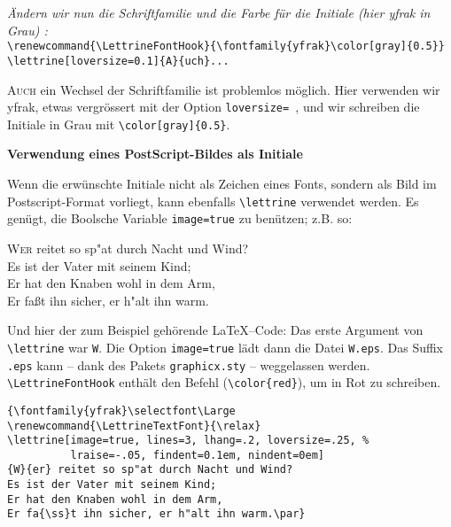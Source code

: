 \documentclass[12pt,a4paper]{article}
\begin{document}
\vspace{.5\baselineskip}
\textit{\"Andern wir nun die Schriftfamilie und die Farbe f\"ur die Initiale
(hier yfrak in Grau) :}\\
\verb+\renewcommand{\LettrineFontHook}{\fontfamily{yfrak}\color[gray]{0.5}}+\\
\verb+\lettrine[loversize=0.1]{A}{uch}...+

{%
\renewcommand{\LettrineFontHook}{\fontfamily{yfrak}\color[gray]{0.5}}

\lettrine[loversize=0.1]{A}{uch} ein Wechsel der
Schriftfamilie ist problemlos m\"oglich. Hier verwenden wir yfrak,
etwas vergr\"ossert mit der Option \verb+loversize= +, und wir schreiben
die Initiale in Grau mit \verb+\color[gray]{0.5}+.
\par}

\newpage
\begin{center}
\large\bfseries Verwendung eines PostScript-Bildes als Initiale
\end{center}

\vspace{\baselineskip} Wenn die erw\"unschte Initiale nicht als Zeichen eines
Fonts, sondern als Bild im Postscript-Format vorliegt, kann ebenfalls
\verb+\lettrine+ verwendet werden. Es gen\"ugt,
die Boolsche Variable \texttt{image=true} zu ben\"utzen; z.B. so:

\vspace{.5\baselineskip}
{%
\selectfont\Large
\renewcommand{\LettrineTextFont}{\relax}
\lettrine[image=true, lines=3, lhang=.2, loversize=.25, %
          lraise=-.05, findent=0.1em, nindent=0em]
{W}{er} reitet so sp"at durch Nacht und Wind?\\
Es ist der Vater mit seinem Kind;\\
Er hat den Knaben wohl in dem Arm,\\
Er fa{\ss}t ihn sicher, er h"alt ihn warm.
\par}

\vspace{\baselineskip} Und hier der zum Beispiel geh\"orende \LaTeX{}--Code:
Das erste Argument von \verb+\lettrine+ war \verb+W+. Die Option \texttt{image=true}
l\"adt dann die Datei \verb+W.eps+. Das Suffix \verb+.eps+ kann -- dank des
Pakets \verb+graphicx.sty+ -- weggelassen werden. \verb+\LettrineFontHook+
enth\"alt den Befehl (\verb+\color{red}+), um in Rot zu schreiben.

\begin{verbatim}
{\fontfamily{yfrak}\selectfont\Large
\renewcommand{\LettrineTextFont}{\relax}
\lettrine[image=true, lines=3, lhang=.2, loversize=.25, %
          lraise=-.05, findent=0.1em, nindent=0em]
{W}{er} reitet so sp"at durch Nacht und Wind?
Es ist der Vater mit seinem Kind;
Er hat den Knaben wohl in dem Arm,
Er fa{\ss}t ihn sicher, er h"alt ihn warm.\par}
\end{verbatim}
\end{document}
